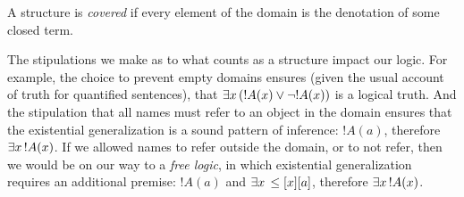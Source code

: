 \documentclass[open-logic-section]{subfiles}
\begin{document}
\begin{defn}
A structure is \emph{covered} if every element of the domain is the
denotation of some closed term.
\end{defn}

The stipulations we make as to what counts as a structure impact our
logic. For example, the choice to prevent empty domains ensures (given
the usual account of truth for quantified sentences), that
$\lexists[x][(!A(x) \lor \lnot !A(x))]$ is a logical truth. And the
stipulation that all names must refer to an object in the domain
ensures that the existential generalization is a sound pattern of
inference: $!A(a)$, therefore $\lexists[x][!A(x)]$. If we allowed names
to refer outside the domain, or to not refer, then we would be on our
way to a \emph{free logic}, in which existential generalization
requires an additional premise: $!A(a)$ and $\lexists[x][\leq[x][a]]$,
therefore $\lexists[x][!A(x)]$.
\end{document}
